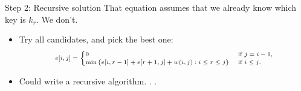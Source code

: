 \documentclass{beamer}
\begin{document}
\begin{frame}{Step 2: Recursive solution}
    That equation assumes that we already know which key is $k_r$.  We don’t.
    \begin{itemize}
        \item Try all candidates, and pick the best one:
            \begin{equation*}
                \scriptsize
                \begin{align*}
                    e[i, j] =
                        \begin{cases}
                            0 & \text{ if } j = i - 1 \text{,} \\
                            \min \left \{ e[i, r-1] + e[r+1, j] + w(i, j):i \leq r \leq j \right \} & \text{ if } i \leq j \text{.}
                        \end{cases}
                \end{align*}
            \end{equation*}
        \item Could write a recursive algorithm. . .
    \end{itemize}
\end{frame}

\begin{frame}{}
\end{frame}

\end{document}
